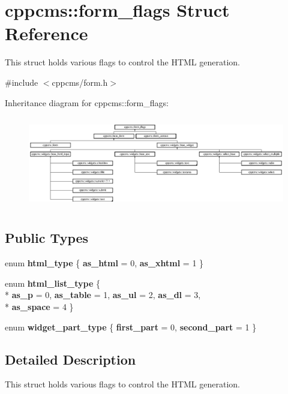 \section{cppcms\-:\-:form\-\_\-flags Struct Reference}
\label{structcppcms_1_1form__flags}


This struct holds various flags to control the H\-T\-M\-L generation.  




{\ttfamily \#include $<$cppcms/form.\-h$>$}

Inheritance diagram for cppcms\-:\-:form\-\_\-flags\-:\begin{figure}[H]
\begin{center}
\leavevmode
\includegraphics[height=4.057971cm]{structcppcms_1_1form__flags}
\end{center}
\end{figure}
\subsection*{Public Types}
\begin{DoxyCompactItemize}
\item 
enum {\bf html\-\_\-type} \{ {\bf as\-\_\-html} = 0, 
{\bf as\-\_\-xhtml} = 1
 \}
\item 
enum {\bf html\-\_\-list\-\_\-type} \{ \\*
{\bf as\-\_\-p} = 0, 
{\bf as\-\_\-table} = 1, 
{\bf as\-\_\-ul} = 2, 
{\bf as\-\_\-dl} = 3, 
\\*
{\bf as\-\_\-space} = 4
 \}
\item 
enum {\bf widget\-\_\-part\-\_\-type} \{ {\bf first\-\_\-part} = 0, 
{\bf second\-\_\-part} = 1
 \}
\end{DoxyCompactItemize}


\subsection{Detailed Description}
This struct holds various flags to control the H\-T\-M\-L generation. 


